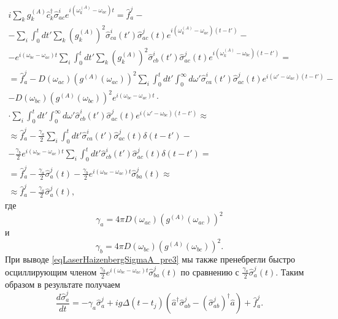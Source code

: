 \begin{eqnarray}
i
\sum_{k}
g_k^{(A)}
\hat{c}_k^{\dag}\hat{\sigma}^{i}_{ac}  
e^{i\left(\omega_k^{(A)} - \omega_{ac}\right)t} = \hat{f}_{a}^{j} -
\nonumber \\
-
\sum_i
\int_0^t d t'
\sum_k 
\left(g_{k}^{(A)}\right)^2
\hat{\sigma}_{ca}^{i}\left(t'\right)\hat{\sigma}^{j}_{ac}\left(t\right) 
e^{i\left(\omega_{k}^{(A)} - \omega_{ac}\right)\left(t-t'\right)}
-
\nonumber \\
-
e^{i\left(\omega_{bc} - \omega_{ac}\right)t}
\sum_i 
\int_0^t d t'
\sum_k
\left(g_{k}^{(A)}\right)^2
\hat{\sigma}_{cb}^{i}\left(t'\right)\hat{\sigma}^{j}_{ac}\left(t\right) 
e^{i\left(\omega_{k}^{(A)} - \omega_{bc}\right)\left(t-t'\right)}
 = 
\nonumber \\
=
\hat{f}_{a}^{j}
-
D\left(\omega_{ac}\right)
\left(g^{(A)}\left(\omega_{ac}\right)\right)^2
\sum_i
\int_0^t d t'
\int_0^{\infty}d \omega' 
\hat{\sigma}_{ca}^{i}\left(t'\right)\hat{\sigma}^{j}_{ac}\left(t\right) 
e^{i\left(\omega' - \omega_{ac}\right)\left(t-t'\right)}
-
\nonumber \\
-
D\left(\omega_{bc}\right)
\left(g^{(A)}\left(\omega_{bc}\right)\right)^2
e^{i\left(\omega_{bc} - \omega_{ac}\right)t} \cdot
\nonumber \\ 
\cdot
\sum_i 
\int_0^t d t'
\int_0^{\infty}d \omega' 
\hat{\sigma}_{cb}^{i}\left(t'\right)\hat{\sigma}^{j}_{ac}\left(t\right) 
e^{i\left(\omega' - \omega_{bc}\right)\left(t-t'\right)}
\approx
\nonumber \\
\approx
\hat{f}_{a}^{j}
- 
\frac{\gamma_{a}}{2}
\sum_i
\int_0^t d t'
\hat{\sigma}_{ca}^{i}\left(t'\right)\hat{\sigma}^{j}_{ac}\left(t\right) 
\delta\left(t-t'\right)
-
\nonumber \\
-
\frac{\gamma_{b}}{2}
e^{i\left(\omega_{bc} - \omega_{ac}\right)t}
\sum_i 
\int_0^t d t'
\hat{\sigma}_{cb}^{i}\left(t'\right)\hat{\sigma}^{j}_{ac}\left(t\right) 
\delta\left(t-t'\right) =
\nonumber \\
= \hat{f}_{a}^{j}
- 
\frac{\gamma_{a}}{2}
\hat{\sigma}_{a}^{j}\left(t\right) 
-
\frac{\gamma_{b}}{2}
e^{i\left(\omega_{bc} - \omega_{ac}\right)t}
\hat{\sigma}_{ba}^{j}\left(t\right) \approx
\nonumber \\
\approx
\hat{f}_{a}^{j}
- 
\frac{\gamma_{a}}{2}
\hat{\sigma}_{a}^{j}\left(t\right),
\label{eqLaserHaizenbergSigmaA_pre3}
\end{eqnarray}
где 
\[
\gamma_{a} = 4 \pi D\left(\omega_{ac}\right)
\left(g^{(A)}\left(\omega_{ac}\right)\right)^2
\]
и
\[
\gamma_{b} = 4 \pi D\left(\omega_{bc}\right)
\left(g^{(A)}\left(\omega_{bc}\right)\right)^2.
\]
При выводе \eqref{eqLaserHaizenbergSigmaA_pre3} мы также пренебрегли
быстро осциллирующим членом 
$\frac{\gamma_{b}}{2}
e^{i\left(\omega_{bc} - \omega_{ac}\right)t}
\hat{\sigma}_{ba}^{j}\left(t\right)$ 
по сравнению с 
$\frac{\gamma_{a}}{2}
\hat{\sigma}_{a}^{j}\left(t\right)$.
Таким образом в результате получаем
\begin{equation}
\frac{d \hat{\sigma}_a^j}{d t} = 
- \gamma_{a} \hat{\sigma}_{a}^{j} +
i g 
\Delta\left(t - t_j\right) 
 \left(
\hat{a}^{\dag}\hat{\sigma}^{j}_{ab} -
\left(\hat{\sigma}^{j}_{ab}\right)^{\dag}\hat{a}
\right) + \hat{f}_{a}^{j}.
\label{eqLaserHaizenbergSigmaAJ}
\end{equation}

